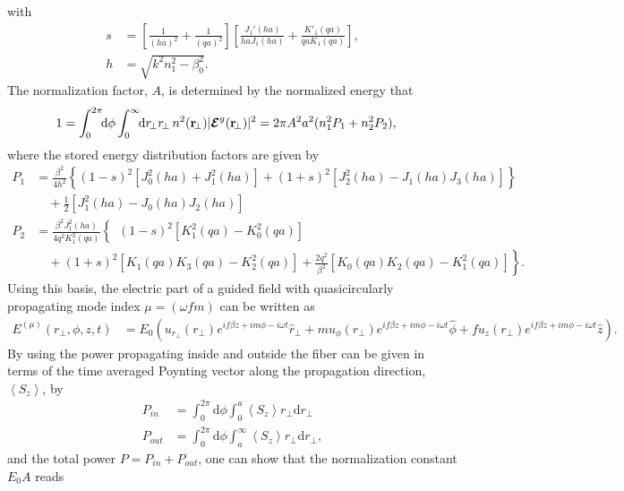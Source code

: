 \documentclass[preprint,aps,pra,onecolumn]{revtex4-1} %
\begin{document}
with
\begin{align}
s &= \left[\frac{1}{(ha)^2}+ \frac{1}{(qa)^2} \right] \left[ \frac{J_1'(ha)}{haJ_1(ha)} + \frac{K'_1(qa)}{qaK_1(qa)} \right],\\
h &= \sqrt{k^2 n_1^2-\beta_0^2}.
\end{align}
The normalization factor, $A$, is determined by the normalized energy that 
\begin{align}
1 &= \int_0^{2\pi} \!\!\mathrm{d} \phi \int_0^\infty\!\!\mathrm{d}r\!_\perp r\!_\perp\,  n^2(\br\!_\perp)|\boldsymbol{\mathcal{E}}^g(\br\!_\perp)|^2 = 2\pi A^2 a^2 (n_1^2P_1 + n_2^2P_2),
\end{align}
where the stored energy distribution factors are given by
\begin{align}
\!\!\!\!\! P_1
&= \frac{\beta^2}{4h^2}\!\left\{(1\!-\! s)^2\!\left[J_0^2(ha)\!+\! J_1^2(ha) \right] \!+\!(1\!+\!s)^2\!\left[J_2^2(ha)\!-\!J_1(ha)J_3(ha) \right]\right\}\nonumber\\
&\quad +\frac{1}{2}\left[J_1^2(ha)-J_0(ha)J_2(ha) \right] \\
\!\!\!\!\! P_2
&= \frac{\beta^2J_1^2(ha)}{4q^2K_1^2(qa)}\!\left\{\phantom{\frac{1}{1}}\!\!\!\!(1\!-\!s)^2\!\left[K_1^2(qa)\!-\!K_0^2(qa) \right]\right.\nonumber\\
&\quad\left. \!+(1\!+\!s)^2\!\!\left[K\!_1\!(qa)K\!_3\!(qa)\!-\! K_2^2\!(qa) \right]\!+\!\frac{2q^2}{\beta^2}\!\!\left[K\!_0\!(qa)K\!_2\!(qa)\!-\!K_1^2\!(qa) \right]  \right\}.
\end{align}
Using this basis, the electric part of a guided field with quasicircularly propagating mode index $\mu=(\omega f m)$ can be written as 
\begin{align}
E^{(\mu)}(r\!_\perp,\phi,z,t) &=E_0(u_{r\!_\perp}(r\!_\perp) e^{if\beta z+im\phi-i\omega t }\hat{r}\!_\perp + m u_{\phi}(r\!_\perp) e^{if\beta z+im\phi-i\omega t }\hat{\phi} + f u_z (r\!_\perp) e^{if\beta z+im\phi-i\omega t }\hat{z}).
\end{align}
By using the power propagating inside and outside the fiber can be given in terms of the time averaged Poynting vector along the propagation direction, $\left< S_z \right>$, by
\begin{align}
P_{in} &= \int_0^{2\pi} \mathrm{d}\phi \int_0^a \left< S_z \right> r\!_\perp \mathrm{d}r\!_\perp\\
P_{out} &= \int_0^{2\pi} \mathrm{d}\phi \int_a^\infty \left< S_z \right> r\!_\perp \mathrm{d}r\!_\perp,
\end{align}
and the total power $ P=P_{in}+P_{out} $, one can show that the normalization constant $ E_0 A $ reads
\end{document}
